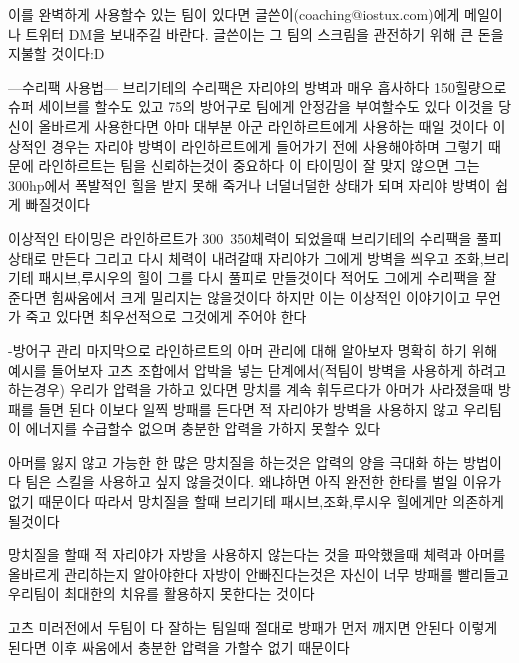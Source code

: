 이를 완벽하게 사용할수 있는 팀이 있다면 글쓴이(coaching@iostux.com)에게 메일이나 트위터 DM을 보내주길 바란다.
글쓴이는 그 팀의 스크림을 관전하기 위해 큰 돈을 지불할 것이다:D

---수리팩 사용법---
브리기테의 수리팩은 자리야의 방벽과 매우 흡사하다
150힐량으로 슈퍼 세이브를 할수도 있고
75의 방어구로 팀에게 안정감을 부여할수도 있다
이것을 당신이 올바르게 사용한다면 아마 대부분 아군 라인하르트에게 사용하는 때일 것이다
이상적인 경우는 자리야 방벽이 라인하르트에게 들어가기 전에 사용해야하며
그렇기 때문에 라인하르트는 팀을 신뢰하는것이 중요하다
이 타이밍이 잘 맞지 않으면 그는 300hp에서 폭발적인 힐을 받지 못해 죽거나 너덜너덜한 상태가 되며 자리야 방벽이 쉽게 빠질것이다

이상적인 타이밍은 라인하르트가 300~350체력이 되었을때 브리기테의 수리팩을 풀피 상태로 만든다
그리고 다시 체력이 내려갈때 자리야가 그에게 방벽을 씌우고 조화,브리기테 패시브,루시우의 힐이 그를 다시 풀피로 만들것이다
적어도 그에게 수리팩을 잘 준다면 힘싸움에서 크게 밀리지는 않을것이다
하지만 이는 이상적인 이야기이고
무언가 죽고 있다면 최우선적으로 그것에게 주어야 한다


-방어구 관리
마지막으로 라인하르트의 아머 관리에 대해 알아보자
명확히 하기 위해 예시를 들어보자
고츠 조합에서 압박을 넣는 단계에서(적팀이 방벽을 사용하게 하려고 하는경우)
우리가 압력을 가하고 있다면 망치를 계속 휘두르다가 아머가 사라졌을때 방패를 들면 된다
이보다 일찍 방패를 든다면 적 자리야가 방벽을 사용하지 않고 우리팀이 에너지를 수급할수 없으며
충분한 압력을 가하지 못할수 있다

아머를 잃지 않고 가능한 한 많은 망치질을 하는것은 압력의 양을 극대화 하는 방법이다
팀은 스킬을 사용하고 싶지 않을것이다.
왜냐하면 아직 완전한 한타를 벌일 이유가 없기 때문이다
따라서 망치질을 할때 브리기테 패시브,조화,루시우 힐에게만 의존하게 될것이다

망치질을 할때 적 자리야가 자방을 사용하지 않는다는 것을 파악했을때 체력과 아머를 올바르게 관리하는지 알아야한다
자방이 안빠진다는것은 자신이 너무 방패를 빨리들고 우리팀이 최대한의 치유를 활용하지 못한다는 것이다

고츠 미러전에서 두팀이 다 잘하는 팀일때 절대로 방패가 먼저 깨지면 안된다
이렇게 된다면 이후 싸움에서 충분한 압력을 가할수 없기 때문이다

